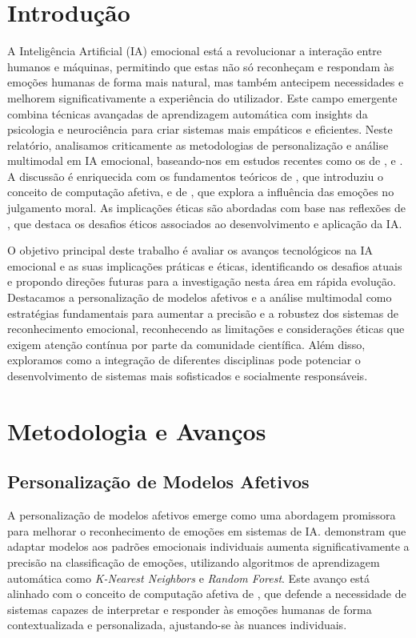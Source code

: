 \documentclass[a4paper,12pt]{report}
\begin{document}
	\section{Introdução}
	
	A Inteligência Artificial (IA) emocional está a revolucionar a interação entre humanos e máquinas, permitindo que estas não só reconheçam e respondam às emoções humanas de forma mais natural, mas também antecipem necessidades e melhorem significativamente a experiência do utilizador. Este campo emergente combina técnicas avançadas de aprendizagem automática com insights da psicologia e neurociência para criar sistemas mais empáticos e eficientes. Neste relatório, analisamos criticamente as metodologias de personalização e análise multimodal em IA emocional, baseando-nos em estudos recentes como os de \textcite{kargarandehkordi2024}, \textcite{gursesli2024} e \textcite{lee2024}. A discussão é enriquecida com os fundamentos teóricos de \textcite{picard1997}, que introduziu o conceito de computação afetiva, e de \textcite{haidt2001}, que explora a influência das emoções no julgamento moral. As implicações éticas são abordadas com base nas reflexões de \textcite{mueller2020}, que destaca os desafios éticos associados ao desenvolvimento e aplicação da IA.
	
	O objetivo principal deste trabalho é avaliar os avanços tecnológicos na IA emocional e as suas implicações práticas e éticas, identificando os desafios atuais e propondo direções futuras para a investigação nesta área em rápida evolução. Destacamos a personalização de modelos afetivos e a análise multimodal como estratégias fundamentais para aumentar a precisão e a robustez dos sistemas de reconhecimento emocional, reconhecendo as limitações e considerações éticas que exigem atenção contínua por parte da comunidade científica. Além disso, exploramos como a integração de diferentes disciplinas pode potenciar o desenvolvimento de sistemas mais sofisticados e socialmente responsáveis.
	
	\section{Metodologia e Avanços}
	
	\subsection{Personalização de Modelos Afetivos}
	
	A personalização de modelos afetivos emerge como uma abordagem promissora para melhorar o reconhecimento de emoções em sistemas de IA. \textcite{kargarandehkordi2024} demonstram que adaptar modelos aos padrões emocionais individuais aumenta significativamente a precisão na classificação de emoções, utilizando algoritmos de aprendizagem automática como \textit{K-Nearest Neighbors} e \textit{Random Forest}. Este avanço está alinhado com o conceito de computação afetiva de \textcite{picard1997}, que defende a necessidade de sistemas capazes de interpretar e responder às emoções humanas de forma contextualizada e personalizada, ajustando-se às nuances individuais.
	
\end{document}
